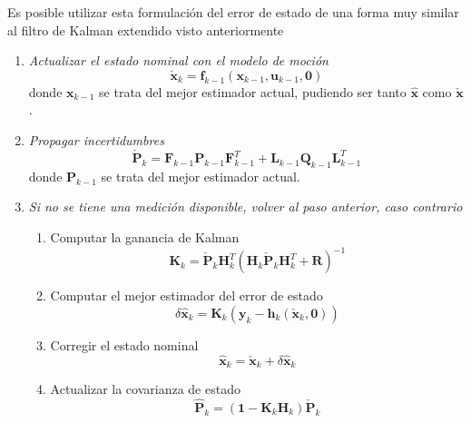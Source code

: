 Es posible utilizar esta formulación del error de estado de una forma muy similar al filtro de Kalman extendido visto anteriormente
\begin{enumerate}
    \item \textit{Actualizar el estado nominal con el modelo de moción}
    \begin{equation}
        \check{\bm{x}}_k = \bm{f}_{k-1}(\bm{x}_{k-1},\bm{u}_{k-1},\bm{0})
    \end{equation}
    donde $\bm{x}_{k-1}$ se trata del mejor estimador actual, pudiendo ser tanto $\hat{\bm{x}}$ como $\check{\bm{x}}$.
    \item \textit{Propagar incertidumbres}
    \begin{equation}
        \check{\bm{P}}_k = \bm{F}_{k-1}\bm{P}_{k-1}\bm{F}_{k-1}^T + \bm{L}_{k-1}\bm{Q}_{k-1}\bm{L}_{k-1}^T
    \end{equation}
    donde $\bm{P}_{k-1}$ se trata del mejor estimador actual.
    \item \textit{Si no se tiene una medición disponible, volver al paso anterior, caso contrario}
    \begin{enumerate}
        \item Computar la ganancia de Kalman
        \begin{equation}
            \bm{K}_k = \check{\bm{P}}_k\bm{H}_k^T(\bm{H}_k\check{\bm{P}}_k\bm{H}_k^T + \bm{R})^{-1}
        \end{equation}{}
        \item Computar el mejor estimador del error de estado
        \begin{equation}
            \delta\hat{\bm{x}}_k = \bm{K}_k(\bm{y}_k - \bm{h}_k(\check{\bm{x}}_k,\bm{0}))
        \end{equation}
        \item Corregir el estado nominal
        \begin{equation}
            \hat{\bm{x}}_k = \check{\bm{x}}_k + \delta\hat{\bm{x}}_k
        \end{equation}
        \item Actualizar la covarianza de estado
        \begin{equation}
            \hat{\bm{P}}_k = (\bm{1} - \bm{K}_k\bm{H}_k)\check{\bm{P}}_k
        \end{equation}
    \end{enumerate}
\end{enumerate}

